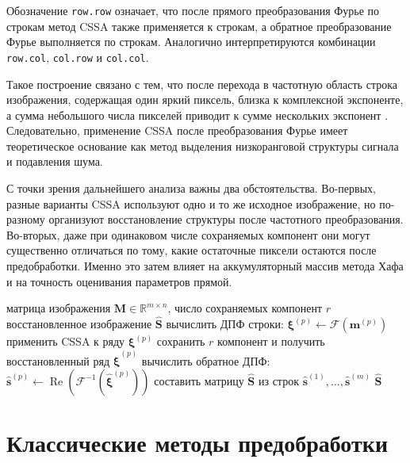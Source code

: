 Обозначение \texttt{row.row} означает, что после прямого преобразования Фурье по строкам метод CSSA также применяется к строкам, а обратное преобразование Фурье выполняется по строкам. Аналогично интерпретируются комбинации \texttt{row.col}, \texttt{col.row} и \texttt{col.col}.

Такое построение связано с тем, что после перехода в частотную область строка изображения, содержащая один яркий пиксель, близка к комплексной экспоненте, а сумма небольшого числа пикселей приводит к сумме нескольких экспонент \cite{trickett2003,zhornikova2016}. Следовательно, применение CSSA после преобразования Фурье имеет теоретическое основание как метод выделения низкоранговой структуры сигнала и подавления шума.

С точки зрения дальнейшего анализа важны два обстоятельства. Во-первых, разные варианты CSSA используют одно и то же исходное изображение, но по-разному организуют восстановление структуры после частотного преобразования. Во-вторых, даже при одинаковом числе сохраняемых компонент они могут существенно отличаться по тому, какие остаточные пиксели остаются после предобработки. Именно это затем влияет на аккумуляторный массив метода Хафа и на точность оценивания параметров прямой.

\begin{algorithm}[H]
	\caption{Алгоритм \texttt{CSSA ROW-ROW}}
	\begin{algorithmic}[1]
		\Require матрица изображения $\mathbf{M}\in\mathbb{R}^{m\times n}$, число сохраняемых компонент $r$
		\Ensure восстановленное изображение $\widehat{\mathbf{S}}$
			\State вычислить ДПФ строки: $\boldsymbol{\xi}^{(p)} \gets \mathcal{F}(\mathbf{m}^{(p)})$
			\State применить CSSA к ряду $\boldsymbol{\xi}^{(p)}$
			\State сохранить $r$ компонент и получить восстановленный ряд $\widehat{\boldsymbol{\xi}}^{(p)}$
			\State вычислить обратное ДПФ:
			$\widehat{\mathbf{s}}^{(p)} \gets \operatorname{Re}(\mathcal{F}^{-1}(\widehat{\boldsymbol{\xi}}^{(p)}))$
		\EndFor
		\State составить матрицу $\widehat{\mathbf{S}}$ из строк $\widehat{\mathbf{s}}^{(1)},\dots,\widehat{\mathbf{s}}^{(m)}$
		\State \Return $\widehat{\mathbf{S}}$
	\end{algorithmic}
\end{algorithm}

\section{Классические методы предобработки}

